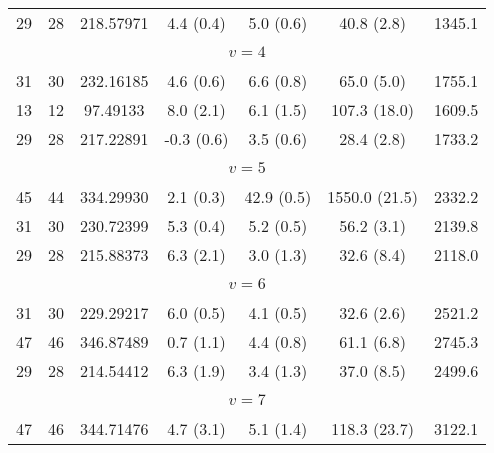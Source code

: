 \begin{table*}[htp]
\begin{tabular}{ccccccc}
 29 & 28 & 218.57971 & 4.4 (0.4) & 5.0 (0.6) & 40.8 (2.8) & 1345.1 \\
&\vspace{-0.75em}\\
\multicolumn{7}{c}{$v = 4$} \\
\vspace{-0.75em}\\
 31 & 30 & 232.16185 & 4.6 (0.6) & 6.6 (0.8) & 65.0 (5.0) & 1755.1 \\
 13 & 12 & 97.49133 & 8.0 (2.1) & 6.1 (1.5) & 107.3 (18.0) & 1609.5 \\
 29 & 28 & 217.22891 & -0.3 (0.6) & 3.5 (0.6) & 28.4 (2.8) & 1733.2 \\
&\vspace{-0.75em}\\
\multicolumn{7}{c}{$v = 5$} \\
\vspace{-0.75em}\\
 45 & 44 & 334.29930 & 2.1 (0.3) & 42.9 (0.5) & 1550.0 (21.5) & 2332.2 \\
 31 & 30 & 230.72399 & 5.3 (0.4) & 5.2 (0.5) & 56.2 (3.1) & 2139.8 \\
 29 & 28 & 215.88373 & 6.3 (2.1) & 3.0 (1.3) & 32.6 (8.4) & 2118.0 \\
&\vspace{-0.75em}\\
\multicolumn{7}{c}{$v = 6$} \\
\vspace{-0.75em}\\
 31 & 30 & 229.29217 & 6.0 (0.5) & 4.1 (0.5) & 32.6 (2.6) & 2521.2 \\
 47 & 46 & 346.87489 & 0.7 (1.1) & 4.4 (0.8) & 61.1 (6.8) & 2745.3 \\
 29 & 28 & 214.54412 & 6.3 (1.9) & 3.4 (1.3) & 37.0 (8.5) & 2499.6 \\
&\vspace{-0.75em}\\
\multicolumn{7}{c}{$v = 7$} \\
\vspace{-0.75em}\\
 47 & 46 & 344.71476 & 4.7 (3.1) & 5.1 (1.4) & 118.3 (23.7) & 3122.1 \\
\hline
\end{tabular}

\par 
\end{table*}
